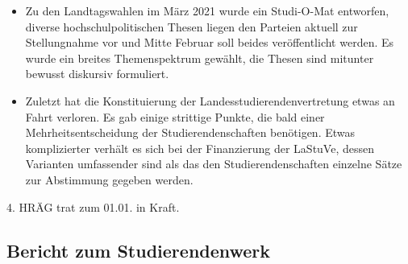 \begin{itemize}
    \item Zu den Landtagswahlen im März 2021 wurde ein Studi-O-Mat entworfen, diverse hochschulpolitischen Thesen liegen den Parteien aktuell zur Stellungnahme vor und Mitte Februar soll beides veröffentlicht werden. Es wurde ein breites Themenspektrum gewählt, die Thesen sind mitunter bewusst diskursiv formuliert.
    \item Zuletzt hat die Konstituierung der Landesstudierendenvertretung etwas an Fahrt verloren. Es gab einige strittige Punkte, die bald einer Mehrheitsentscheidung der Studierendenschaften benötigen. Etwas komplizierter verhält es sich bei der Finanzierung der LaStuVe, dessen Varianten umfassender sind als das den Studierendenschaften einzelne Sätze zur Abstimmung gegeben werden.
\end{itemize}
4. HRÄG trat zum 01.01. in Kraft.
\subsection{Bericht zum Studierendenwerk \label{bericht:4}}
